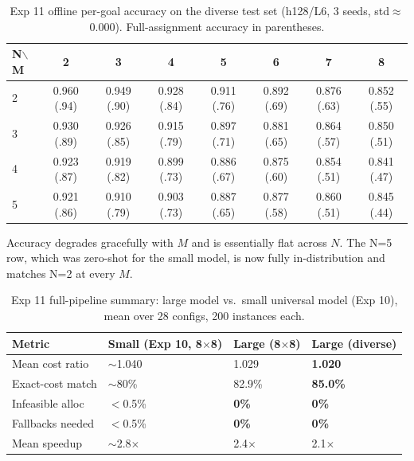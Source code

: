 \documentclass[11pt,a4paper]{article}
\begin{document}
\begin{table}[htbp]
\centering
\caption{Exp 11 offline per-goal accuracy on the diverse test set (h128/L6, 3 seeds,
std$\approx$0.000). Full-assignment accuracy in parentheses.}
\small\setlength{\tabcolsep}{5.5pt}
\begin{tabular}{lccccccc}
\toprule
\textbf{N$\backslash$M} & \textbf{2} & \textbf{3} & \textbf{4} & \textbf{5} & \textbf{6} & \textbf{7} & \textbf{8} \\
\midrule
2 & 0.960 (.94) & 0.949 (.90) & 0.928 (.84) & 0.911 (.76) & 0.892 (.69) & 0.876 (.63) & 0.852 (.55) \\
3 & 0.930 (.89) & 0.926 (.85) & 0.915 (.79) & 0.897 (.71) & 0.881 (.65) & 0.864 (.57) & 0.850 (.51) \\
4 & 0.923 (.87) & 0.919 (.82) & 0.899 (.73) & 0.886 (.67) & 0.875 (.60) & 0.854 (.51) & 0.841 (.47) \\
5 & 0.921 (.86) & 0.910 (.79) & 0.903 (.73) & 0.887 (.65) & 0.877 (.58) & 0.860 (.51) & 0.845 (.44) \\
\bottomrule
\end{tabular}
\label{tab:exp11_offline}
\end{table}

Accuracy degrades gracefully with $M$ and is essentially flat across $N$. The N=5 row, which
was zero-shot for the small model, is now fully in-distribution and matches N=2 at every $M$.

\begin{table}[htbp]
\centering
\caption{Exp 11 full-pipeline summary: large model vs.\ small universal model (Exp 10), mean
over 28 configs, 200 instances each.}
\begin{tabularx}{\textwidth}{lXXX}
\toprule
\textbf{Metric} & \textbf{Small (Exp 10, 8$\times$8)} & \textbf{Large (8$\times$8)} & \textbf{Large (diverse)} \\
\midrule
Mean cost ratio  & $\sim$1.040 & 1.029         & \textbf{1.020} \\
Exact-cost match & $\sim$80\%  & 82.9\%        & \textbf{85.0\%} \\
Infeasible alloc & $<$0.5\%   & \textbf{0\%}  & \textbf{0\%} \\
Fallbacks needed & $<$0.5\%   & \textbf{0\%}  & \textbf{0\%} \\
Mean speedup     & $\sim$2.8$\times$ & 2.4$\times$ & 2.1$\times$ \\
\bottomrule
\end{tabularx}
\label{tab:exp11_summary}
\end{table}
\end{document}
